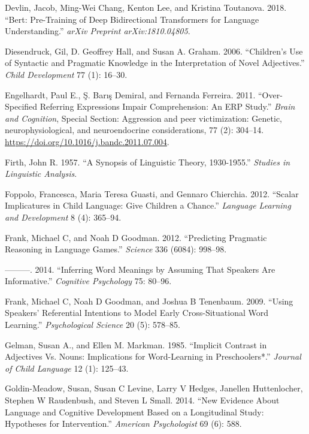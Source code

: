 \documentclass{ucetd}
\newlength{\cslhangindent}
\newenvironment{cslreferences}%
{\setlength{\parindent}{0pt}%
\everypar{\setlength{\hangindent}{\cslhangindent}}\ignorespaces}%
{\par}
\begin{document}
\begin{cslreferences}
\leavevmode\hypertarget{ref-devlin2018}{}%
Devlin, Jacob, Ming-Wei Chang, Kenton Lee, and Kristina Toutanova. 2018.
``Bert: Pre-Training of Deep Bidirectional Transformers for Language
Understanding.'' \emph{arXiv Preprint arXiv:1810.04805}.

\leavevmode\hypertarget{ref-diesendruck_childrens_2006}{}%
Diesendruck, Gil, D. Geoffrey Hall, and Susan A. Graham. 2006.
``Children's Use of Syntactic and Pragmatic Knowledge in the
Interpretation of Novel Adjectives.'' \emph{Child Development} 77 (1):
16--30.

\leavevmode\hypertarget{ref-engelhardt_over-specified_2011}{}%
Engelhardt, Paul E., Ş. Barış Demiral, and Fernanda Ferreira. 2011.
``Over-Specified Referring Expressions Impair Comprehension: An ERP
Study.'' \emph{Brain and Cognition}, Special Section: Aggression and
peer victimization: Genetic, neurophysiological, and neuroendocrine
considerations, 77 (2): 304--14.
\url{https://doi.org/10.1016/j.bandc.2011.07.004}.

\leavevmode\hypertarget{ref-firth1957}{}%
Firth, John R. 1957. ``A Synopsis of Linguistic Theory, 1930-1955.''
\emph{Studies in Linguistic Analysis}.

\leavevmode\hypertarget{ref-foppolo_scalar_2012}{}%
Foppolo, Francesca, Maria Teresa Guasti, and Gennaro Chierchia. 2012.
``Scalar Implicatures in Child Language: Give Children a Chance.''
\emph{Language Learning and Development} 8 (4): 365--94.

\leavevmode\hypertarget{ref-frank2012}{}%
Frank, Michael C, and Noah D Goodman. 2012. ``Predicting Pragmatic
Reasoning in Language Games.'' \emph{Science} 336 (6084): 998--98.

\leavevmode\hypertarget{ref-frank2014}{}%
---------. 2014. ``Inferring Word Meanings by Assuming That Speakers Are
Informative.'' \emph{Cognitive Psychology} 75: 80--96.

\leavevmode\hypertarget{ref-frank2009}{}%
Frank, Michael C, Noah D Goodman, and Joshua B Tenenbaum. 2009. ``Using
Speakers' Referential Intentions to Model Early Cross-Situational Word
Learning.'' \emph{Psychological Science} 20 (5): 578--85.

\leavevmode\hypertarget{ref-gelman_implicit_1985}{}%
Gelman, Susan A., and Ellen M. Markman. 1985. ``Implicit Contrast in
Adjectives Vs. Nouns: Implications for Word-Learning in Preschoolers*.''
\emph{Journal of Child Language} 12 (1): 125--43.

\leavevmode\hypertarget{ref-goldin-meadow2014}{}%
Goldin-Meadow, Susan, Susan C Levine, Larry V Hedges, Janellen
Huttenlocher, Stephen W Raudenbush, and Steven L Small. 2014. ``New
Evidence About Language and Cognitive Development Based on a
Longitudinal Study: Hypotheses for Intervention.'' \emph{American
Psychologist} 69 (6): 588.


\end{cslreferences}
\end{document}
